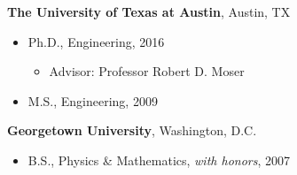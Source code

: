 %
\textbf{The University of Texas at Austin}, 
Austin, TX
\begin{itemize}

\item Ph.D., 
        Engineering, 2016
        \begin{itemize}
        \item Advisor: Professor Robert D. Moser
        \end{itemize}

\item M.S., 
      Engineering, 2009 

\end{itemize}

\textbf{Georgetown University}, 
Washington, D.C. 
\begin{itemize}

\item B.S., 
        Physics \& Mathematics, \emph{with honors}, 2007
\end{itemize}



